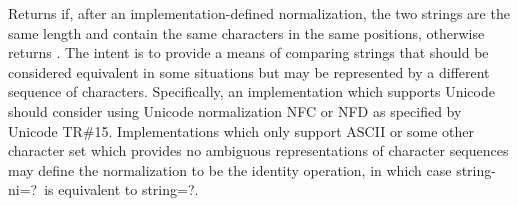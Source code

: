 \begin{entry}{%
}

Returns \schtrue{} if, after an implementation-defined normalization,
the two strings are the same length and contain the same characters in
the same positions, otherwise returns \schfalse.  The intent is to
provide a means of comparing strings that should be considered
equivalent in some situations but may be represented by a different
sequence of characters.  Specifically, an implementation which
supports Unicode should consider using Unicode normalization NFC or
NFD as specified by Unicode TR\#15.  Implementations which only
support ASCII or some other character set which provides no ambiguous
representations of character sequences may define the normalization to
be the identity operation, in which case {\cf string-ni=?}\ is
equivalent to {\cf string=?}.

\end{entry}


